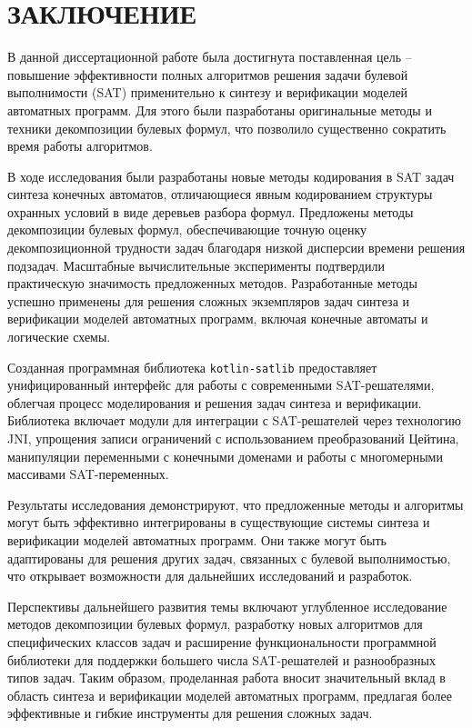 \chapter*{ЗАКЛЮЧЕНИЕ}

В данной диссертационной работе была достигнута поставленная цель \--- повышение эффективности полных алгоритмов решения задачи булевой выполнимости (SAT) применительно к синтезу и верификации моделей автоматных программ.
Для этого были пазработаны оригинальные методы и техники декомпозиции булевых формул, что позволило существенно сократить время работы алгоритмов.

В ходе исследования были разработаны новые методы кодирования в SAT задач синтеза конечных автоматов, отличающиеся явным кодированием структуры охранных условий в виде деревьев разбора формул.
Предложены методы декомпозиции булевых формул, обеспечивающие точную оценку декомпозиционной трудности задач благодаря низкой дисперсии времени решения подзадач.
Масштабные вычислительные эксперименты подтвердили практическую значимость предложенных методов.
Разработанные методы успешно применены для решения сложных экземпляров задач синтеза и верификации моделей автоматных программ, включая конечные автоматы и логические схемы.

Созданная программная библиотека \texttt{kotlin-satlib} предоставляет унифицированный интерфейс для работы с современными SAT-решателями, облегчая процесс моделирования и решения задач синтеза и верификации. Библиотека включает модули для интеграции с SAT-решателей через технологию JNI, упрощения записи ограничений с использованием преобразований Цейтина, манипуляции переменными с конечными доменами и работы с многомерными массивами SAT-переменных.

Результаты исследования демонстрируют, что предложенные методы и алгоритмы могут быть эффективно интегрированы в существующие системы синтеза и верификации моделей автоматных программ.
Они также могут быть адаптированы для решения других задач, связанных с булевой выполнимостью, что открывает возможности для дальнейших исследований и разработок.

Перспективы дальнейшего развития темы включают углубленное исследование методов декомпозиции булевых формул, разработку новых алгоритмов для специфических классов задач и расширение функциональности программной библиотеки для поддержки большего числа SAT-решателей и разнообразных типов задач.
Таким образом, проделанная работа вносит значительный вклад в область синтеза и верификации моделей автоматных программ, предлагая более эффективные и гибкие инструменты для решения сложных задач.
